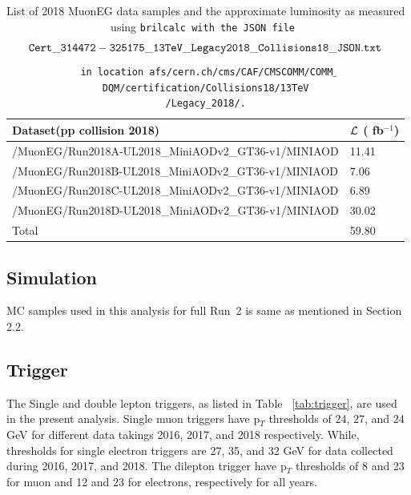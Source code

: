 \documentclass{cernatlasnote}
\newcommand{\fbinv}{\! fb$^{-1}$\xspace}
\begin{document}
\begin{table}[htbp]\label{tab:datasets2018}
\begin{center}
\begin{tabular}{|l|l|}
\hline
Dataset(pp collision 2018) & $\cal L$ (\fbinv) \\\hline
 /MuonEG/Run2018A-UL2018\_MiniAODv2\_GT36-v1/MINIAOD      &  11.41 \\
 /MuonEG/Run2018B-UL2018\_MiniAODv2\_GT36-v1/MINIAOD    & 7.06 \\
  /MuonEG/Run2018C-UL2018\_MiniAODv2\_GT36-v1/MINIAOD     & 6.89  \\
  /MuonEG/Run2018D-UL2018\_MiniAODv2\_GT36-v1/MINIAOD     & 30.02 \\ \hline
Total  & 59.80 \\ \hline
\end{tabular}
\end{center}
\caption{List of 2018 MuonEG data samples and the approximate luminosity as measured using \tt brilcalc with the JSON file $${\tt Cert\_314472-325175\_13TeV\_Legacy2018\_Collisions18\_JSON.txt}$$ in location afs/cern.ch/cms/CAF/CMSCOMM/COMM$\_$DQM/certification/Collisions18/13TeV \\/Legacy\_2018/.}\label{tab:datasets2018}
\end{table}
\subsection{Simulation}\label{sec:samples}
 MC samples used in this analysis for full Run~2 is same as mentioned in Section 2.2. 


\subsection{Trigger}
The Single and double lepton triggers, as listed in Table ~\ref{tab:trigger}, are used in the present analysis. Single muon triggers have p$_{T}$ thresholds of 24, 27, and 24 GeV for different data takings 2016, 2017, and 2018 respectively. While, thresholds for single electron triggers are 27, 35, and 32 GeV for data collected during 2016, 2017, and 2018. 
The dilepton trigger have p$_{T}$ thresholds of 8 and 23 for muon and 12 and 23 for electrons, respectively for all years.
\end{document}
